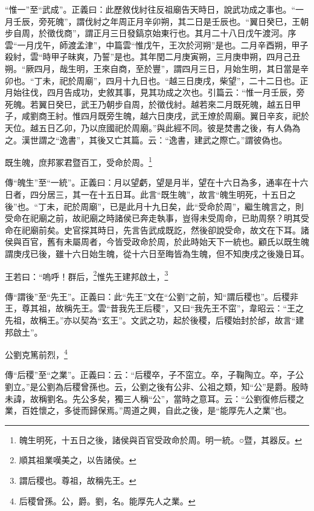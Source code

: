 {\noindent\shu{}\fzkt “惟一”至“武成”。正義曰：此歷敘伐紂往反祖廟告天時日，說武功成之事也。“一月壬辰，旁死魄”，謂伐紂之年周正月辛卯朔，其二日是壬辰也。“翼日癸巳，王朝步自周，於徵伐商”，謂正月三日發鎬京始東行也。其月二十八日戊午渡河。序雲“一月戊午，師渡孟津”，中篇雲“惟戊午，王次於河朔”是也。二月辛酉朔，甲子殺紂，雲“時甲子昧爽，乃誓”是也。其年閏二月庚寅朔，三月庚申朔，四月己丑朔。“厥四月，哉生明，王來自商，至於豐”，謂四月三日，月始生明，其日當是辛卯也。“丁未，祀於周廟”，四月十九日也。“越三日庚戌，柴望”，二十二日也。正月始往伐，四月告成功，史敘其事，見其功成之次也。引篇云：“惟一月壬辰，旁死魄。若翼日癸巳，武王乃朝步自周，於徵伐紂。越若來二月既死魄，越五日甲子，咸劉商王紂。惟四月既旁生魄，越六日庚戌，武王燎於周廟。翼日辛亥，祀於天位。越五日乙卯，乃以庶國祀於周廟。”與此經不同。彼是焚書之後，有人偽為之。漢世謂之“逸書”，其後又亡其篇。云：“逸書，建武之際亡。”謂彼偽也。 \par}

既生魄，庶邦冢君暨百工，受命於周。\footnote{魄生明死，十五日之後，諸侯與百官受政命於周。明一統。○暨，其器反。}

{\noindent\zhuan{}\fzbyks 傳“魄生”至“一統”。正義曰：月以望虧，望是月半，望在十六日為多，通率在十六日者，四分居三，其一在十五日耳。此言“既生魄”，故言“魄生明死，十五日之後”也。“丁未，祀於周廟”，已是此月十九日矣，此“受命於周”，繼生魄言之，則受命在祀廟之前，故祀廟之時諸侯已奔走執事，豈得未受周命，已助周祭？明其受命在祀廟前矣。史官探其時日，先言告武成既訖，然後卻說受命，故文在下耳。諸侯與百官，舊有未屬周者，今皆受政命於周，於此時始天下一統也。顧氏以既生魄謂庚戌已後，雖十六日始生魄，從十六日至晦皆為生魄，但不知庚戌之後幾日耳。 \par}

王若曰：“嗚呼！群后，\footnote{順其祖業嘆美之，以告諸侯。}惟先王建邦啟土，\footnote{謂后稷也。尊祖，故稱先王。}

{\noindent\zhuan{}\fzbyks 傳“謂後”至“先王”。正義曰：此“先王”文在“公劉”之前，知“謂后稷也”。后稷非王，尊其祖，故稱先王。雲“昔我先王后稷”，又曰“我先王不窋”，韋昭云：“王之先祖，故稱王。”亦以契為“玄王”。文武之功，起於後稷，后稷始封於邰，故言“建邦啟土”。 \par}

公劉克篤前烈，\footnote{后稷曾孫。公，爵。劉，名。能厚先人之業。}

{\noindent\zhuan{}\fzbyks 傳“后稷”至“之業”。正義曰：云：“后稷卒，子不窋立。卒，子鞠陶立。卒，子公劉立。”是公劉為后稷曾孫也。云，公劉之後有公非、公祖之類，知“公”是爵。殷時未諱，故稱劉名。先公多矣，獨三人稱“公”，當時之意耳。云：“公劉復修后稷之業，百姓懷之，多徙而歸保焉。”周道之興，自此之後，是“能厚先人之業”也。 \par}

